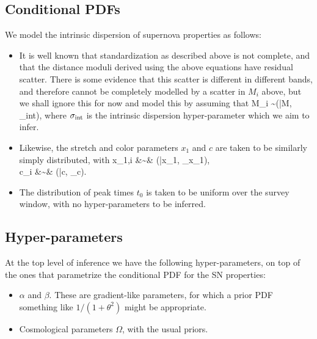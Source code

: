 \documentclass{article}[10pt]
\begin{document}
\subsection{Conditional PDFs}

We model the intrinsic dispersion of supernova properties as follows:
\begin{itemize}

    \item It is well known that standardization as described above is not complete, and that the distance moduli derived using the above equations have residual scatter. There is some evidence that this scatter is different in different bands, and therefore cannot be completely modelled by a scatter in $M_i$ above, but we shall ignore this for now and model this by assuming that \be M_i \sim {}(\bar{M}, \sigma_{\rm int}), \ee where $\sigma_{\rm int}$ is the intrinsic dispersion hyper-parameter which we aim to infer.

    \item Likewise, the stretch and color parameters $x_1$ and $c$ are taken to be similarly simply distributed, with
    \bea
       x_{1,i} &\sim& (\bar{x_1}, \sigma_{x_1}), \\
       c_i     &\sim& (\bar{c}, \sigma_{c}).
    \eea

    \item The distribution of peak times $t_0$ is taken to be uniform over the survey window, with no hyper-parameters to be inferred.

\end{itemize}


\subsection{Hyper-parameters}

At the top level of inference we have the following hyper-parameters, on top of the ones that parametrize the conditional PDF for the SN properties:

\begin{itemize}

\item $\alpha$ and $\beta$. These are gradient-like parameters, for which a prior PDF something like $1/(1+\theta^2)$ might be appropriate.

\item Cosmological parameters $\Omega$, with the usual priors.

\end{itemize}
\end{document}
